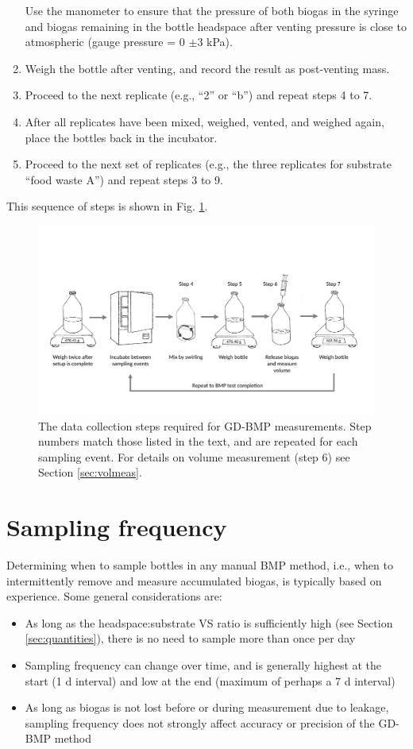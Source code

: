 \documentclass[]{article}
\begin{document}
\begin{enumerate}
      Use the manometer to ensure that the pressure of both biogas in the syringe and biogas remaining in the bottle headspace after venting pressure is close to atmospheric (gauge pressure = 0 $\pm3 $ kPa).
    \item Weigh the bottle after venting, and record the result as post-venting mass. 
    \item Proceed to the next replicate (e.g., ``2'' or ``b'') and repeat steps 4 to 7.
    \item After all replicates have been mixed, weighed, vented, and weighed again, place the bottles back in the incubator.
    \item Proceed to the next set of replicates (e.g., the three replicates for substrate ``food waste A'') and repeat steps 3 to 9.
\end{enumerate}

This sequence of steps is shown in Fig. \ref{fig:steps}.

\begin{figure}[ht]
  \includegraphics[width=\textwidth]{figs/GD_steps.pdf}
  \caption{The data collection steps required for GD-BMP measurements. Step numbers match those listed in the text, and are repeated for each sampling event. For details on volume measurement (step 6) see Section \ref{sec:volmeas}.}
  \label{fig:steps}
\end{figure}

\section{Sampling frequency}
\label{sec:freq}

Determining when to sample bottles in any manual BMP method, i.e., when to intermittently remove and measure accumulated biogas, is typically based on experience. 
Some general considerations are:
\begin{itemize}
	\item As long as the headspace:substrate VS ratio is sufficiently high (see Section \ref{sec:quantities}), there is no need to sample more than once per day
  \item Sampling frequency can change over time, and is generally highest at the start (1 d interval) and low at the end (maximum of perhaps a 7 d interval)
  \item As long as biogas is not lost before or during measurement due to leakage, sampling frequency does not strongly affect accuracy or precision of the GD-BMP method
\end{itemize}
\end{document}
